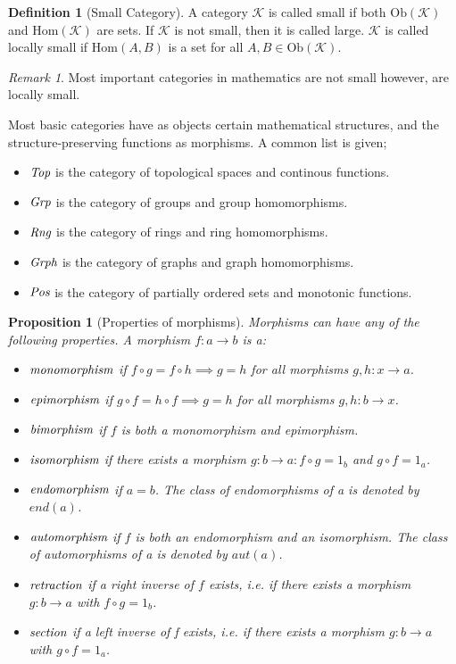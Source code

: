 \documentclass[10pt, oneside, reqno]{amsart}
\theoremstyle{plain}%
\newtheorem{prop}[thm]{Proposition}
\theoremstyle{definition}
\newtheorem{defn}[thm]{Definition}
\theoremstyle{remark}
\newtheorem*{rem}{Remark}
\newcommand{\Cat}{\mathcal{K}}
\begin{document}
\begin{defn}[Small Category]
	A category $\Cat$ is called small if both $\text{Ob}(\Cat)$ and $\text{Hom}(\Cat)$ are sets.
	If $\Cat$ is not small, then it is called large.
	$\Cat$ is called locally small if $\text{Hom}(A,B)$ is a set for all $A, B \in \text{Ob}(\Cat)$.
\end{defn}

\begin{rem}
	Most important categories in mathematics are not small however, are locally small.
\end{rem}

Most basic categories have as objects certain mathematical structures, and the structure-preserving
functions as morphisms. A common list is given;
\begin{itemize}
\item $\emph{Top}$ is the category of topological spaces and continous functions.
\item $\emph{Grp}$ is the category of groups and group homomorphisms.
\item $\emph{Rng}$ is the category of rings and ring homomorphisms.
\item $\emph{Grph}$ is the category of graphs and graph homomorphisms.
\item $\emph{Pos}$ is the category of partially ordered sets and monotonic functions.
\end{itemize}

\begin{prop}[Properties of morphisms]
Morphisms can have any of the following properties. A morphism $f: a \to b$ is a:
\begin{itemize}
\item $\emph{monomorphism}$ if $f \circ g = f \circ h \implies g = h$ for all morphisms $g,h: x \to a$.
\item $\emph{epimorphism}$ if $g \circ f = h \circ f \implies g = h$ for all morphisms $g,h: b \to x$.
\item $\emph{bimorphism}$ if $f$ is both a monomorphism and epimorphism.
\item $\emph{isomorphism}$ if there exists a morphism $g: b \to a : f \circ g = 1_{b}$
 and $g \circ f = 1_{a}$.
\item $\emph{endomorphism}$ if $a = b$.
The class of endomorphisms of a is denoted by $end(a)$.
\item $\emph{automorphism}$ if $f$ is both an endomorphism and an isomorphism.
The class of automorphisms of a is denoted by $aut(a)$.
\item $\emph{retraction}$ if a right inverse of $f$ exists,
 i.e. if there exists a morphism $g: b \to a$ with $f \circ g = 1_{b}$.
\item $\emph{section}$ if a left inverse of f exists,
 i.e. if there exists a morphism $g: b \to a$ with $g \circ f = 1_{a}$.
\end{itemize}
\end{prop}
\end{document}
